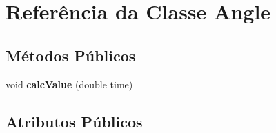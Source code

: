 \hypertarget{classAngle}{
\section{Referência da Classe Angle}
\label{classAngle}
}
\subsection*{Métodos Públicos}
\begin{DoxyCompactItemize}
\item 
\hypertarget{classAngle_a449cc8d99abc3592acad415db189c766}{
void {\bfseries calcValue} (double time)}
\label{classAngle_a449cc8d99abc3592acad415db189c766}

\end{DoxyCompactItemize}
\subsection*{Atributos Públicos}
